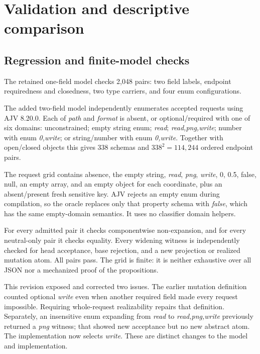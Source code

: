 \section{Validation and descriptive comparison}\label{validation-and-descriptive-comparison}

\subsection{Regression and finite-model checks}\label{regression-and-finite-model-checks}

The retained one-field model checks 2,048 pairs: two field labels, endpoint requiredness and closedness, two type carriers, and four enum configurations.

The added two-field model independently enumerates accepted requests using AJV 8.20.0. Each of \emph{path} and \emph{format} is absent, or optional/required with one of six domains: unconstrained; empty string enum; \emph{read}; \emph{read,png,write}; number with enum \emph{0,write}; or string/number with enum \emph{0,write}. Together with open/closed objects this gives 338 schemas and \(338^2=114{,}244\) ordered endpoint pairs.

The request grid contains absence, the empty string, \emph{read}, \emph{png}, \emph{write}, 0, 0.5, false, null, an empty array, and an empty object for each coordinate, plus an absent/present fresh sensitive key. AJV rejects an empty enum during compilation, so the oracle replaces only that property schema with \emph{false}, which has the same empty-domain semantics. It uses no classifier domain helpers.

For every admitted pair it checks componentwise non-expansion, and for every neutral-only pair it checks equality. Every widening witness is independently checked for head acceptance, base rejection, and a new projection or realized mutation atom. All pairs pass. The grid is finite: it is neither exhaustive over all JSON nor a mechanized proof of the propositions.

This revision exposed and corrected two issues. The earlier mutation definition counted optional \emph{write} even when another required field made every request impossible. Requiring whole-request realizability repairs that definition. Separately, an insensitive enum expanding from \emph{read} to \emph{read,png,write} previously returned a \emph{png} witness; that showed new acceptance but no new abstract atom. The implementation now selects \emph{write}. These are distinct changes to the model and implementation.

